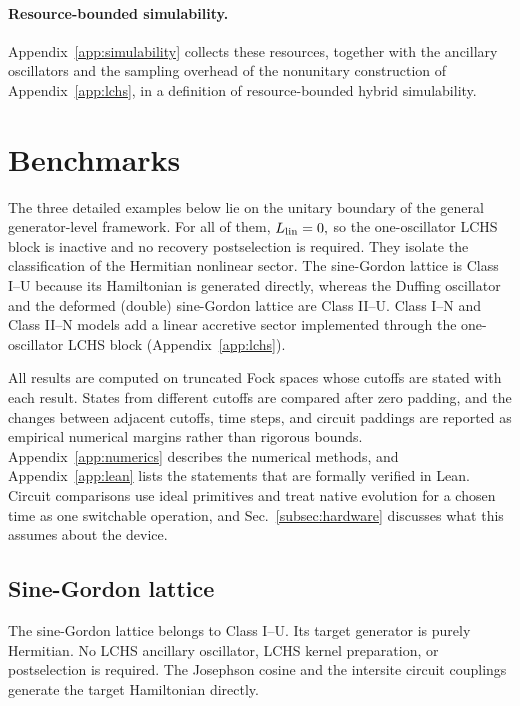 \documentclass[pra,twocolumn,superscriptaddress,nofootinbib,floatfix]{revtex4-2}
\theoremstyle{remark}
\newcommand{\revcolor}{\color{blue}}
\DeclareRobustCommand{\rev}[1]{{\revcolor #1}}
\begin{document}
\paragraph{Resource-bounded simulability.}
\rev{Appendix~\ref{app:simulability} collects these resources, together with the ancillary oscillators and the sampling overhead of the nonunitary construction of Appendix~\ref{app:lchs}, in a definition of resource-bounded hybrid simulability.}

\section{\rev{Benchmarks}}
\label{sec:benchmarks}

\rev{The three detailed examples below lie on the unitary boundary of the general generator-level framework.} \rev{For all of them, $L_{\rm lin}=0,$ so the one-oscillator LCHS block is inactive and no recovery postselection is required.} They isolate the classification of the Hermitian nonlinear sector. \rev{The sine-Gordon lattice is Class I--U because its Hamiltonian is generated directly, whereas the Duffing oscillator and the deformed (double) sine-Gordon lattice are Class II--U.} \rev{Class I--N and Class II--N models add a linear accretive sector implemented through the one-oscillator LCHS block (Appendix~\ref{app:lchs}).}

\rev{All results are computed on truncated Fock spaces whose cutoffs are stated with each result.} \rev{States from different cutoffs are compared after zero padding, and the changes between adjacent cutoffs, time steps, and circuit paddings are reported as empirical numerical margins rather than rigorous bounds.} \rev{Appendix~\ref{app:numerics} describes the numerical methods, and Appendix~\ref{app:lean} lists the statements that are formally verified in Lean.} \rev{Circuit comparisons use ideal primitives and treat native evolution for a chosen time as one switchable operation, and Sec.~\ref{subsec:hardware} discusses what this assumes about the device.}

\subsection{\rev{Sine-Gordon lattice}}
\label{sec:sg}

The sine-Gordon lattice belongs to Class I--U. Its target generator is purely Hermitian. No LCHS ancillary oscillator, LCHS kernel preparation, or postselection is required. The Josephson cosine and the intersite circuit couplings generate the target Hamiltonian directly.
\end{document}
